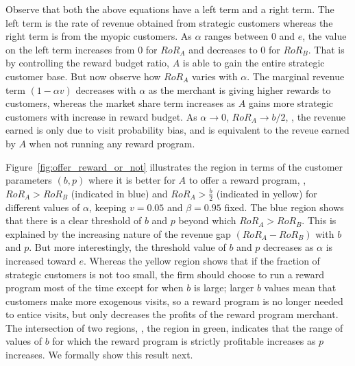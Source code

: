 Observe that both the above equations have a left term and a right term. The left term is the rate of revenue obtained from strategic customers whereas the right term is from the myopic customers.
As $\alpha$ ranges between $0$ and $e$, the value on the left term increases from $0$ for $RoR_A$ and decreases to $0$ for $RoR_B$.
That is by controlling the reward budget ratio, $A$ is able to gain the entire strategic customer base.
But now observe how $RoR_A$ varies with $\alpha$.
The marginal revenue term $(1-\alpha v)$ decreases with $\alpha$ as the merchant is giving higher rewards to customers, whereas the market share term increases as $A$ gains more strategic customers with increase in reward budget.
As $\alpha \to 0$, $RoR_A \to b/2$, \ie, the revenue earned is only due to visit probability bias, and is equivalent to the reveue earned by $A$ when not running any reward program.

Figure~\ref{fig:offer_reward_or_not} illustrates the region in terms of the customer parameters $(b,p)$ where it is better for $A$ to offer a reward program, \ie, $RoR_A > RoR_B$ (indicated in blue) and $RoR_A > \frac{b}{2}$ (indicated in yellow) for different values of $\alpha$, keeping $v = 0.05$ and $\beta = 0.95$ fixed.
The blue region shows that there is a clear threshold of $b$ and $p$ beyond which $RoR_A > RoR_B$.
This is explained by the increasing nature of the revenue gap $(RoR_A - RoR_B)$ with $b$ and $p$.
But more interestingly, the threshold value of $b$ and $p$ decreases as $\alpha$ is increased toward $e$.
Whereas the yellow region shows that if the fraction of strategic customers is not too small, the firm should choose to run a reward program most of the time except for when $b$ is large; larger $b$ values mean that customers make more exogenous visits, so a reward program is no longer needed to entice visits, but only decreases the profits of the reward program merchant.
The intersection of two regions, \ie, the region in green, indicates that the range of values of $b$ for which the reward program is strictly profitable increases as $p$ increases.
We formally show this result next.

